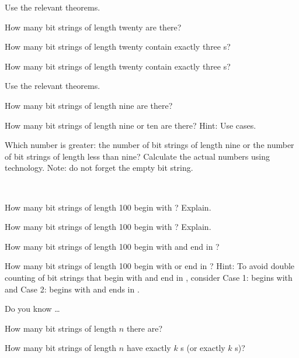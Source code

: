 \begin{exer} [\exerP] %
\label{exer_count_bs20}
    Use the relevant theorems.
        \begin{exerpart}
            \item How many bit strings of length twenty are there?
            \item How many bit strings of length twenty contain exactly three s?
            \item How many bit strings of length twenty contain exactly three s?      
        \end{exerpart}
\end{exer}

\begin{exer} [\exerU] %
\label{exer_count_bs9}
    Use the relevant theorems.
        \begin{exerpart}
            \item How many bit strings of length nine are there? 
            \item How many bit strings of length nine or ten are there?  Hint: Use cases.
            \item Which number is greater: the number of bit strings of length nine or the number of bit strings of length less than nine?  Calculate the actual numbers using technology.  Note: do not forget the empty bit string. 
    \end{exerpart}
\end{exer}

\begin{exer}[\exerU] %
\label{exer_count_bs100}  
~
    \begin{exerpart}
        \item How many bit strings of length 100 begin with ? Explain.
        \item How many bit strings of length 100 begin with ? Explain.
        \item How many bit strings of length 100 begin with  and end in ?
        \item How many bit strings of length 100 begin with or end in ?  Hint: To avoid double counting of bit strings that begin with  and end in , consider Case 1: begins with  and Case 2: begins with  and ends in .
    \end{exerpart}
\end{exer}

\begin{exer}[\exerR] %
\label{exer_dyk_numberbs}
    Do you know \ldots
        \begin{exerpart}
            \item How many bit strings of length $n$ there are? 
            \item How many bit strings of length $n$ have exactly $k$ s (or exactly $k$ s)?
        \end{exerpart}
\end{exer}

